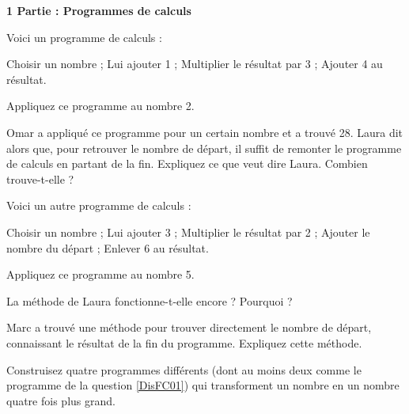 \begin{TP}

\vspace{1em}\textbf{1 Partie : Programmes de calculs}\vspace{1em}


\item Voici un programme de calculs :

\begin{center}
    \begin{minipage}{.6\linewidth}
        \begin{oldalgorithme}
Choisir un nombre ;
Lui ajouter 1 ;
Multiplier le résultat par 3 ;  
Ajouter 4 au résultat.%
        \end{oldalgorithme}
    \end{minipage}
\end{center}

\vspace{.5em}

Appliquez ce programme au nombre 2.

\item Omar a appliqué ce programme pour un certain nombre et a trouvé 28. Laura dit alors que, pour retrouver le nombre de départ, il suffit de \og remonter \fg le programme de calculs en partant de la fin. Expliquez ce que veut dire Laura. Combien trouve-t-elle ?
\item \label{DisFC01} Voici un autre programme de calculs :


\begin{center}
    \begin{minipage}{.6\linewidth}
        \begin{oldalgorithme}
Choisir un nombre ;
Lui ajouter 3 ;
Multiplier le résultat par 2 ;
Ajouter le nombre du départ ;
Enlever 6 au résultat.%
        \end{oldalgorithme}
    \end{minipage}
\end{center}

\vspace{.5em}


Appliquez ce programme au nombre 5.

\item La méthode de Laura fonctionne-t-elle encore ? Pourquoi ?
\item Marc a trouvé une méthode pour trouver directement le nombre de départ, connaissant le résultat de la fin du programme. Expliquez cette méthode.
\item Construisez quatre programmes différents (dont au moins deux comme le programme de la question \ref{DisFC01}) qui transforment un nombre en un nombre quatre fois plus grand. 



\end{TP}
